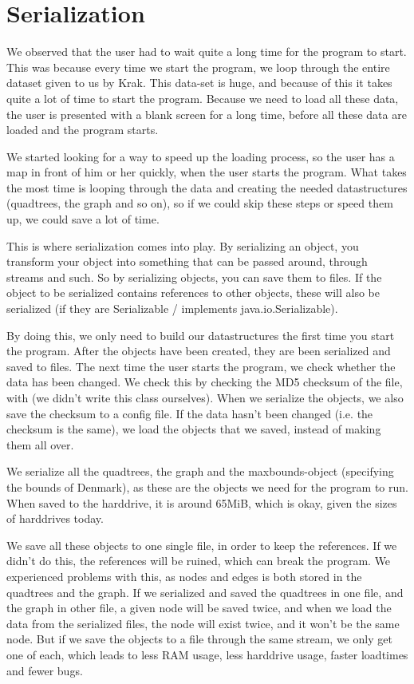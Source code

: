\section{Serialization}
\label{IMPL-SERI}
We observed that the user had to wait quite a long time for the program to start. This 
was because every time we start the program, we loop through the entire dataset given 
to us by Krak. This data-set is huge, and because of this it takes quite a lot of time to 
start the program. Because we need to load all these data, the user is presented with 
a blank screen for a long time, before all these data are loaded and the program starts.

We started looking for a way to speed up the loading process, so the user has a map in 
front of him or her quickly, when the user starts the program. What takes the most time 
is looping through the data and creating the needed datastructures (quadtrees, the 
graph and so on), so if we could skip these steps or speed them up, we could save a lot 
of time.

This is where serialization comes into play. By serializing an object, you transform your 
object into something that can be passed around, through streams and such. So by 
serializing objects, you can save them to files. If the object to be serialized contains 
references to other objects, these will also be serialized (if they are Serializable / 
implements java.io.Serializable).

By doing this, we only need to build our datastructures the first time you start the program. 
After the objects have been created, they are been serialized and saved to files. The next 
time the user starts the program, we check whether the data has been changed. We check 
this by checking the MD5 checksum of the file, with  (we didn't write 
this class ourselves). When we serialize the objects, we also save the checksum to a config 
file. If the data hasn't been changed (i.e. the checksum is the same), we load the objects that 
we saved, instead of making them all over.

We serialize all the quadtrees, the graph and the maxbounds-object (specifying the bounds 
of Denmark), as these are the objects we need for the program to run. When saved to the 
harddrive, it is around 65MiB, which is okay, given the sizes of harddrives today.

We save all these objects to one single file, in order to keep the references. If we didn't do 
this, the references will be ruined, which can break the program. We experienced problems 
with this, as nodes and edges is both stored in the quadtrees and the graph. If we serialized 
and saved the quadtrees in one file, and the graph in other file, a given node will be saved 
twice, and when we load the data from the serialized files, the node will exist twice, and it 
won't be the same node. But if we save the objects to a file through the same stream, we only 
get one of each, which leads to less RAM usage, less harddrive usage, faster loadtimes and 
fewer bugs.

